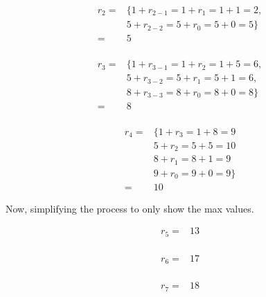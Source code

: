 \documentclass[12pt]{article}
\begin{document}
\begin{equation*} \label{rc2}
\begin{split}
r_2 = & \{ 1+r_{2-1}=1+r_1=1+1=2, \\
      & 5+r_{2-2}=5+r_0=5+0=5\} \\
    = & 5 \\
\end{split}
\end{equation*}

\begin{equation*} \label{rc3}
\begin{split}
r_3 = & \{ 1+r_{3-1}=1+r_2=1+5=6, \\
      & 5+r_{3-2}=5+r_1=5+1=6, \\
      & 8+r_{3-3}=8+r_0=8+0=8 \}\\
    = & 8 \\
\end{split}
\end{equation*}

\begin{equation*} \label{rc4}
\begin{split}
r_4 = & \{ 1+r_3=1+8=9 \\
      & 5+r_2=5+5=10 \\
      & 8+r_1=8+1=9 \\
      & 9+r_0=9+0=9\} \\
    = & 10
\end{split}
\end{equation*}

Now, simplifying the process to only show the max values.

\begin{equation*} \label{rc5}
\begin{split}
r_5 = & 13\\
\end{split}
\end{equation*}

\begin{equation*} \label{rc6}
\begin{split}
r_6 = & 17\\
\end{split}
\end{equation*}

\begin{equation*} \label{rc7}
\begin{split}
r_7 = & 18\\
\end{split}
\end{equation*}
\end{document}
